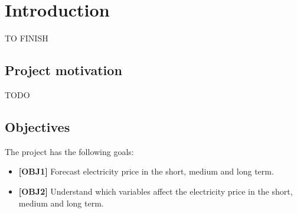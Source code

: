 \chapter{Introduction}
%
%
TO FINISH

\section{Project motivation}
TODO

\section{Objectives}
The project has the following goals:
\begin{itemize}
    \item \textbf{[OBJ1]} Forecast electricity price in the short, medium and long term.
    \item \textbf{[OBJ2]} Understand which variables affect the electricity price in the short, medium and long term.
\end{itemize}